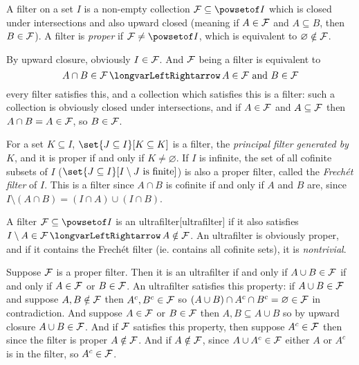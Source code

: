 \bdefn

    A {\emphcolor filter} on a set $I$ is a non-empty collection ${\cal F}\subseteq\powsetof I$ which is closed under intersections and also upward closed (meaning if $A\in{\cal F}$ and
    $A\subseteq B$, then $B\in{\cal F}$).
    A filter is {\it proper} if ${\cal F}\neq\powsetof I$, which is equivalent to $\varnothing\notin{\cal F}$.

\edefn

By upward closure, obviously $I\in{\cal F}$.
And ${\cal F}$ being a filter is equivalent to
$$ A\cap B\in{\cal F} \iff A\in{\cal F}\hbox{ and }B\in{\cal F} $$
every filter satisfies this, and a collection which satisfies this is a filter: such a collection is obviously closed under intersections, and if $A\in{\cal F}$ and $A\subseteq{\cal F}$ then
$A\cap B=A\in{\cal F}$, so $B\in{\cal F}$.

For a set $K\subseteq I$, $\set{J\subseteq I}[K\subseteq K]$ is a filter, the {\it principal filter generated by $K$}, and it is proper if and only if $K\neq\varnothing$.
If $I$ is infinite, the set of all cofinite subsets of $I$ ($\set{J\subseteq I}[I\setminus J\hbox{ is finite}]$) is also a proper filter, called the {\it Frech\'et filter} of $I$.
This is a filter since $A\cap B$ is cofinite if and only if $A$ and $B$ are, since $I\setminus(A\cap B)=(I\cap A)\cup(I\cap B)$.

\bdefn

    A filter ${\cal F}\subseteq\powsetof I$ is an {\emphcolor ultrafilter}[ultrafilter] if it also satisfies $I\setminus A\in{\cal F}\iff A\notin{\cal F}$.
    An ultrafilter is obviously proper, and if it contains the Frech\'et filter (ie. contains all cofinite sets), it is {\it nontrivial}.

\edefn

Suppose ${\cal F}$ is a proper filter.
Then it is an ultrafilter if and only if $A\cup B\in{\cal F}$ if and only if $A\in{\cal F}$ or $B\in{\cal F}$.
An ultrafilter satisfies this property: if $A\cup B\in{\cal F}$ and suppose $A,B\notin{\cal F}$ then $A^c,B^c\in{\cal F}$ so $(A\cup B)\cap A^c\cap B^c=\varnothing\in{\cal F}$ in contradiction.
And suppose $A\in{\cal F}$ or $B\in{\cal F}$ then $A,B\subseteq A\cup B$ so by upward closure $A\cup B\in{\cal F}$.
And if ${\cal F}$ satisfies this property, then suppose $A^c\in{\cal F}$ then since the filter is proper $A\notin{\cal F}$.
And if $A\notin{\cal F}$, since $A\cup A^c\in{\cal F}$ either $A$ or $A^c$ is in the filter, so $A^c\in{\cal F}$.

